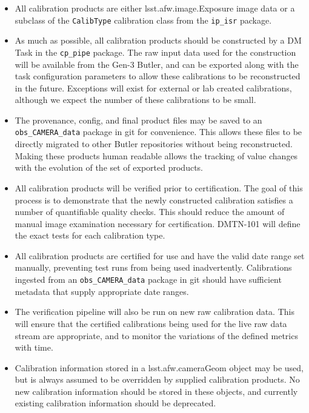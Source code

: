 \documentclass[DM,authoryear,toc]{lsstdoc}
\begin{document}
\begin{itemize}
\item All calibration products are either lsst.afw.image.Exposure
  image data or a subclass of the \verb|CalibType| calibration class
  from the \verb|ip_isr| package.
\item As much as possible, all calibration products should be
  constructed by a DM Task in the \verb|cp_pipe| package.  The raw
  input data used for the construction will be available from the
  Gen-3 Butler, and can be exported along with the task configuration
  parameters to allow these calibrations to be reconstructed in the
  future.  Exceptions will exist for external or lab created
  calibrations, although we expect the number of these calibrations to
  be small.
\item The provenance, config, and final product files may be saved to
  an \verb|obs_CAMERA_data| package in git for convenience.  This
  allows these files to be directly migrated to other Butler
  repositories without being reconstructed.  Making these products
  human readable allows the tracking of value changes with the
  evolution of the set of exported products.
\item All calibration products will be verified prior to
  certification.  The goal of this process is to demonstrate that the
  newly constructed calibration satisfies a number of quantifiable
  quality checks.  This should reduce the amount of manual image
  examination necessary for certification.  DMTN-101 will define the
  exact tests for each calibration type.
\item All calibration products are certified for use and have the
  valid date range set manually, preventing test runs from being used
  inadvertently.  Calibrations ingested from an \verb|obs_CAMERA_data|
  package in git should have sufficient metadata that supply
  appropriate date ranges.
\item The verification pipeline will also be run on new raw
  calibration data.  This will ensure that the certified calibrations
  being used for the live raw data stream are appropriate, and to
  monitor the variations of the defined metrics with time.
\item Calibration information stored in a lsst.afw.cameraGeom object
  may be used, but is always assumed to be overridden by supplied
  calibration products.  No new calibration information should be
  stored in these objects, and currently existing calibration
  information should be deprecated.

\end{itemize}
\end{document}
